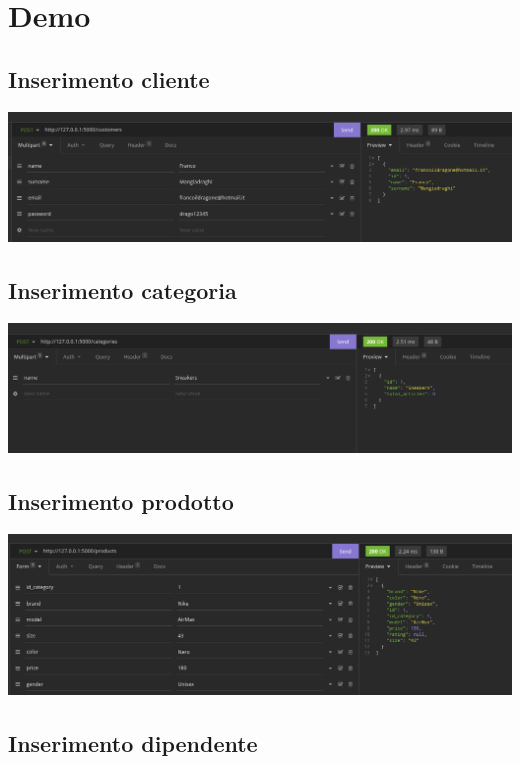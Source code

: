 \section{Demo}

\subsection{Inserimento cliente}
\begin{center}
\includegraphics[scale=0.33]{images/inserimento_cliente.png}
\end{center}
\subsection{Inserimento categoria}

\includegraphics[scale=0.33]{images/inserimento_categoria.png}

\subsection{Inserimento prodotto}

\includegraphics[scale=0.33]{images/inserimento_prodotto.png}

\subsection{Inserimento dipendente}

